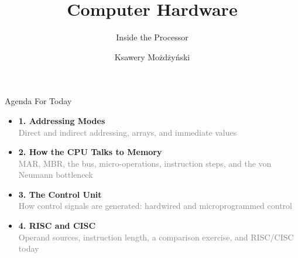 \documentclass[aspectratio=169,10pt]{beamer}
\title{Computer Hardware}
\subtitle{Inside the Processor}
\author{Ksawery Możdżyński}
\date{}
\begin{document}
\begin{frame}
  \titlepage
\end{frame}

\begin{frame}{Agenda For Today}
  \Large
  \begin{itemize}
    \item[\textcolor{DeepBlue}{\faMapMarker}] \textbf{1. Addressing Modes} \\
    \textcolor{gray}{\small Direct and indirect addressing, arrays, and immediate values}
    \vspace{0.25cm}

    \item[\textcolor{DeepBlue}{\faArrowRight}] \textbf{2. How the CPU Talks to Memory} \\
    \textcolor{gray}{\small MAR, MBR, the bus, micro-operations, instruction steps, and the von Neumann bottleneck}
    \vspace{0.25cm}

    \item[\textcolor{DeepBlue}{\faSitemap}] \textbf{3. The Control Unit} \\
    \textcolor{gray}{\small How control signals are generated: hardwired and microprogrammed control}
    \vspace{0.25cm}

    \item[\textcolor{DeepBlue}{\faBalanceScale}] \textbf{4. RISC and CISC} \\
    \textcolor{gray}{\small Operand sources, instruction length, a comparison exercise, and RISC/CISC today}
  \end{itemize}
\end{frame}
\end{document}
